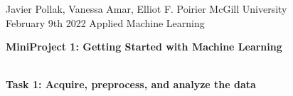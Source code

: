\documentclass[11pt]{article}
\begin{document}
\noindent Javier Pollak, Vanessa Amar, Elliot F. Poirier
\hfill
McGill University
\\
February 9th 2022
\hfill
Applied Machine Learning
\\
\begin{center}
\textbf{\LARGE{MiniProject 1: Getting Started with Machine Learning}}   
\end{center}
\hfill
\\

\noindent \textbf{\Large{Task 1: Acquire, preprocess, and analyze the data}}\\
\end{document}
